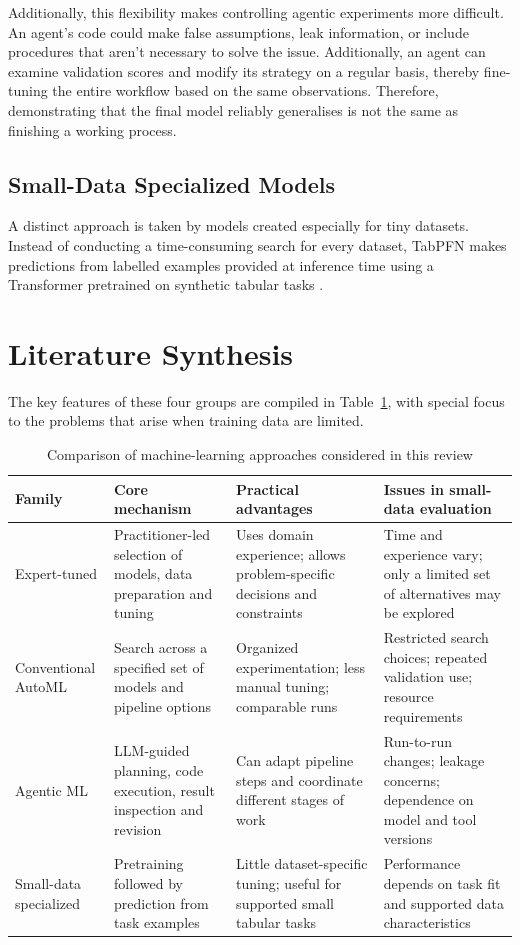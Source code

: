 \documentclass[acmsmall,screen]{acmart}
\begin{document}
Additionally, this flexibility makes controlling agentic experiments more difficult. An agent's code could make false assumptions, leak information, or include procedures that aren't necessary to solve the issue. Additionally, an agent can examine validation scores and modify its strategy on a regular basis, thereby fine-tuning the entire workflow based on the same observations. Therefore, demonstrating that the final model reliably generalises is not the same as finishing a working process.

\subsection{Small-Data Specialized Models}

A distinct approach is taken by models created especially for tiny datasets. Instead of conducting a time-consuming search for every dataset, TabPFN makes predictions from labelled examples provided at inference time using a Transformer pretrained on synthetic tabular tasks \cite{hollmann2023}.

\section{Literature Synthesis}\label{sec:synthesis}

The key features of these four groups are compiled in Table~\ref{tab:families}, with special focus to the problems that arise when training data are limited.

\begin{table}[t]
\caption{Comparison of machine-learning approaches considered in this review}
\label{tab:families}
\centering
\small
\begin{tabularx}{\textwidth}{@{}p{}X X X@{}}
\toprule
Family & Core mechanism & Practical advantages & Issues in small-data evaluation\\
\midrule
Expert-tuned & Practitioner-led selection of models, data preparation and tuning & Uses domain experience; allows problem-specific decisions and constraints & Time and experience vary; only a limited set of alternatives may be explored\\
Conventional AutoML & Search across a specified set of models and pipeline options & Organized experimentation; less manual tuning; comparable runs & Restricted search choices; repeated validation use; resource requirements\\
Agentic ML & LLM-guided planning, code execution, result inspection and revision & Can adapt pipeline steps and coordinate different stages of work & Run-to-run changes; leakage concerns; dependence on model and tool versions\\
Small-data specialized & Pretraining followed by prediction from task examples & Little dataset-specific tuning; useful for supported small tabular tasks & Performance depends on task fit and supported data characteristics\\
\bottomrule
\end{tabularx}
\end{table}
\end{document}
